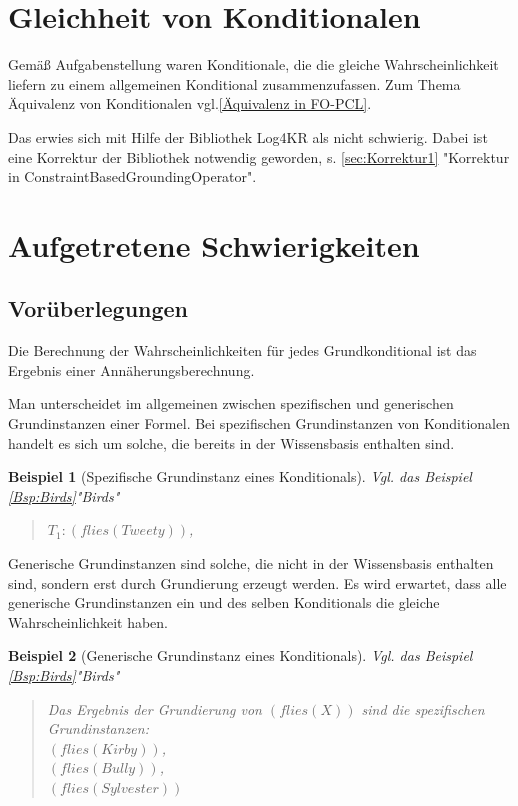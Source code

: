 \documentclass[a4paper, 11pt]{book}
\newtheorem{Bsp}{Beispiel}[section]
\begin{document}
\section{Gleichheit von Konditionalen} 
Gemäß Aufgabenstellung waren Konditionale, die die gleiche Wahrscheinlichkeit liefern zu einem allgemeinen Konditional zusammenzufassen. Zum Thema Äquivalenz von Konditionalen vgl.\ref{Äquivalenz in FO-PCL}.

Das erwies sich mit Hilfe der Bibliothek Log4KR als nicht schwierig. Dabei ist eine Korrektur der Bibliothek notwendig geworden, s. \ref{sec:Korrektur1} "{}Korrektur in ConstraintBasedGroundingOperator"{}.


\section{Aufgetretene Schwierigkeiten}
\subsection{Vorüberlegungen}
Die Berechnung der Wahrscheinlichkeiten für jedes Grundkonditional ist das Ergebnis einer Annäherungsberechnung.

Man unterscheidet im allgemeinen zwischen spezifischen und generischen Grundinstanzen einer Formel.  
Bei spezifischen Grundinstanzen von Konditionalen handelt es sich um solche, die bereits in der Wissensbasis enthalten sind.

\label{Bsp:Spez Grundinstanz} 
\begin{Bsp}[Spezifische Grundinstanz eines Konditionals]
	
	Vgl. das Beispiel \ref{Bsp:Birds}"{}Birds"{}
	\begin{quote}
		$ T_{1}  :  (flies(Tweety)) $,\\
	\end{quote}
\end{Bsp}

Generische Grundinstanzen sind solche, die nicht in der Wissensbasis enthalten sind, sondern erst durch Grundierung erzeugt werden. 
Es wird erwartet, dass alle generische Grundinstanzen ein und des selben Konditionals die gleiche Wahrscheinlichkeit haben.

\label{Bsp:Gen Grundinstanz} 
\begin{Bsp}[Generische Grundinstanz eines Konditionals]
	
	Vgl. das Beispiel \ref{Bsp:Birds}"{}Birds"{}
	\begin{quote}
		Das Ergebnis der Grundierung von $ (flies(X)) $ sind die spezifischen Grundinstanzen:\\
		$ (flies(Kirby)) $,\\
		$ (flies(Bully)) $,\\
		$ (flies(Sylvester)) $\\
		
	\end{quote}
\end{Bsp}
\end{document}
